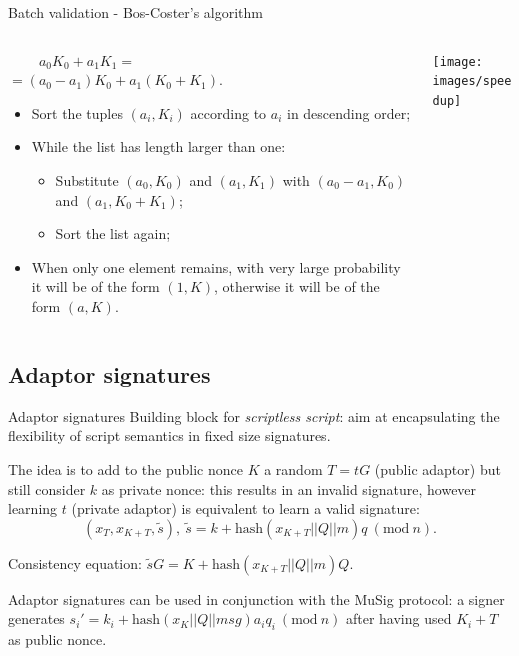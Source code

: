 \documentclass[slidescentered]{beamer}
\begin{document}
	\begin{frame}{Batch validation - Bos-Coster's algorithm}
		\begin{columns}
			\begin{column}{0.5\linewidth}
				$\ \ \ \ \ \ \ \ \ \ a_0K_0 + a_1K_1 =$ \\ $= (a_0 - a_1)K_0 + a_1(K_0 + K_1)$.
				
				\bigskip
				
				\begin{itemize}
					\item Sort the tuples $(a_i, K_i)$ according to $a_i$ in descending order;
					\item While the list has length larger than one:
					\begin{itemize}
						\item Substitute $(a_0, K_0)$ and $(a_1, K_1)$ with $(a_0 - a_1, K_0)$ and $(a_1, K_0 + K_1)$;
						\item Sort the list again;
					\end{itemize}
					\item When only one element remains, with very large probability it will be of the form $(1, K)$, otherwise it will be of the form $(a, K)$.
				\end{itemize}
			\end{column}
			\begin{column}{0.5\linewidth}
				\hspace*{0cm}
				\texttt{[image: images/speedup]}
			\end{column}
		\end{columns}
	\end{frame}

		\subsection{Adaptor signatures}
		\begin{frame}[label = adaptor]{Adaptor signatures}
		Building block for \textit{scriptless script}: aim at encapsulating the flexibility of script semantics in fixed size signatures.
	
		\bigskip
		\noindent
		The idea is to add to the public nonce $K$ a random $T = tG$ (public adaptor) but still consider $k$ 	as private nonce: this results in an invalid signature, however learning $t$ (private adaptor) is equivalent to learn a valid signature:
		$$(x_T, x_{K + T}, \tilde{s}), \ \tilde{s} = k + \text{hash}(x_{K + T}||Q||m)q \ (\text{mod} \ n).$$
		{\centering
		Consistency equation: $\tilde{s}G = K + \text{hash}(x_{K + T}||Q||m)Q.$
		\par}
	
		\bigskip
		\noindent
		Adaptor signatures can be used in conjunction with the MuSig protocol:
		a signer generates $s_i' = k_i + \text{hash}(x_K || Q || msg)a_iq_i \ (\text{mod} \ n)$ after having used $K_i + T$ as public nonce.
	\end{frame}
\end{document}

